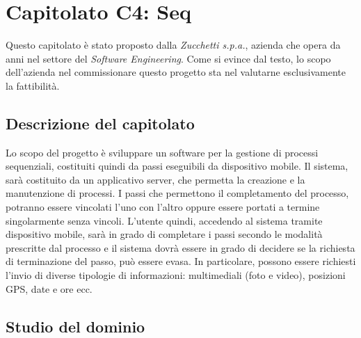 \section{Capitolato C4: Seq}
\label{capitolato4}
Questo capitolato è stato proposto dalla \textit{Zucchetti s.p.a.}, azienda che opera da anni nel settore del \textit{Software Engineering}. Come si evince dal testo, lo scopo dell'azienda nel commissionare questo progetto sta nel valutarne esclusivamente la fattibilità.
 
\subsection{Descrizione del capitolato}
\label{descrizionecap4}
Lo scopo del progetto è sviluppare un software per la gestione di processi sequenziali, costituiti quindi da passi eseguibili da dispositivo mobile. Il sistema, sarà costituito da un applicativo server, che permetta la creazione e la manutenzione di processi. I passi che permettono il completamento del processo, potranno essere vincolati l'uno con l'altro oppure essere portati a termine singolarmente senza vincoli. L'utente quindi, accedendo al sistema tramite dispositivo mobile, sarà in grado di completare i passi secondo le modalità prescritte dal processo e il sistema dovrà essere in grado di decidere se la richiesta di terminazione del passo, può essere evasa. In particolare, possono essere richiesti l'invio di diverse tipologie di informazioni: multimediali (foto e video), posizioni GPS, date e ore ecc. 

\subsection{Studio del dominio}
\label{dominiocap4}
